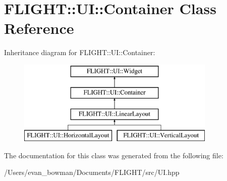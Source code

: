 \hypertarget{class_f_l_i_g_h_t_1_1_u_i_1_1_container}{}\section{F\+L\+I\+G\+HT\+:\+:UI\+:\+:Container Class Reference}
\label{class_f_l_i_g_h_t_1_1_u_i_1_1_container}
Inheritance diagram for F\+L\+I\+G\+HT\+:\+:UI\+:\+:Container\+:\begin{figure}[H]
\begin{center}
\leavevmode
\includegraphics[height=4.000000cm]{class_f_l_i_g_h_t_1_1_u_i_1_1_container}
\end{center}
\end{figure}


The documentation for this class was generated from the following file\+:\begin{DoxyCompactItemize}
\item 
/\+Users/evan\+\_\+bowman/\+Documents/\+F\+L\+I\+G\+H\+T/src/U\+I.\+hpp\end{DoxyCompactItemize}
